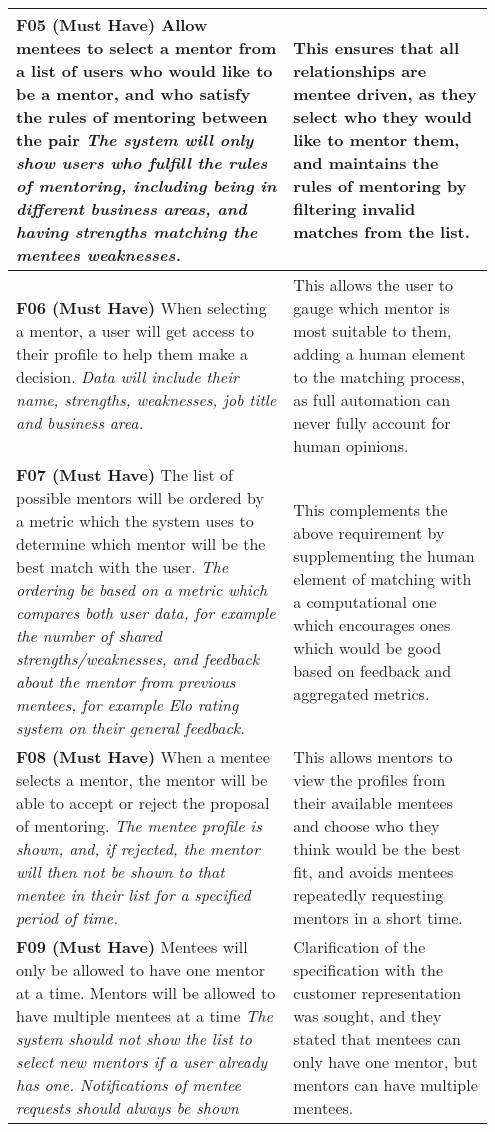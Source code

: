 \documentclass[10pt]{article}
\begin{document}
\begin{longtable}{|p{0.55\linewidth}|p{0.4\linewidth}|}
    \textbf{F05 (Must Have) }
    Allow mentees to select a mentor from a list of users who would like to
    be a mentor, and who satisfy the rules of mentoring between the pair
    \textit{The system will only show users who fulfill the rules of mentoring,
    including being in different business areas, and having strengths matching
    the mentees weaknesses.}
        &
    This ensures that all relationships are mentee driven, as they select who
    they would like to mentor them, and maintains the rules of mentoring by
    filtering invalid matches from the list.
    \\ \hline

    \textbf{F06 (Must Have) }
    When selecting a mentor, a user will get access to their profile to help
    them make a decision.
    \textit{Data will include their name, strengths, weaknesses, job title and
    business area.}
        &
    This allows the user to gauge which mentor is most suitable to them,
    adding a human element to the matching process, as full automation can never
    fully account for human opinions.
    \\ \hline

    \textbf{F07 (Must Have) }
    The list of possible mentors will be ordered by a metric which the system
    uses to determine which mentor will be the best match with the user.
    \textit{The ordering be based on a metric which compares both user data, for
    example the number of shared strengths/weaknesses, and feedback about the
    mentor from previous mentees, for example Elo rating system
    \cite{chess_ranking} on their general feedback.}
        &
    This complements the above requirement by supplementing the human element of
    matching with a computational one which encourages ones which would be good
    based on feedback and aggregated metrics.
    \\ \hline

    \textbf{F08 (Must Have) }
    When a mentee selects a mentor, the mentor will be able to accept or reject
    the proposal of mentoring.
    \textit{The mentee profile is shown, and, if rejected, the mentor will then
    not be shown to that mentee in their list for a specified period of time.}
        &
    This allows mentors to view the profiles from their available mentees and
    choose who they think would be the best fit, and avoids mentees repeatedly
    requesting mentors in a short time.
    \\ \hline

    \textbf{F09 (Must Have) }
    Mentees will only be allowed to have one mentor at a time. Mentors will
    be allowed to have multiple mentees at a time
    \textit{The system should not show the list to select new mentors if a
    user already has one. Notifications of mentee requests should always be
    shown}
        &
    Clarification of the specification with the customer representation was
    sought, and they stated that mentees can only have one mentor, but mentors
    can have multiple mentees.
    \\ \hline


\end{longtable}
\end{document}
